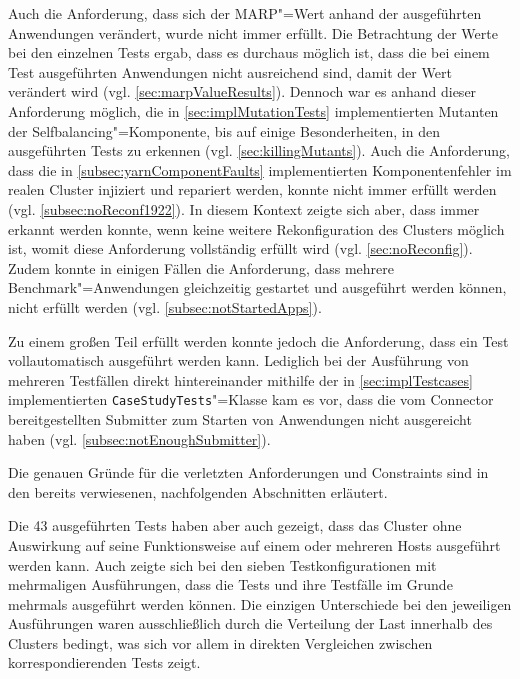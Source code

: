 Auch die Anforderung, dass sich der MARP"=Wert anhand der ausgeführten Anwendungen verändert, wurde nicht immer erfüllt.
Die Betrachtung der Werte bei den einzelnen Tests ergab, dass es durchaus möglich ist, dass die bei einem Test ausgeführten Anwendungen nicht ausreichend sind, damit der Wert verändert wird (vgl. \cref{sec:marpValueResults}).
Dennoch war es anhand dieser Anforderung möglich, die in \cref{sec:implMutationTests} implementierten Mutanten der Selfbalancing"=Komponente, bis auf einige Besonderheiten, in den ausgeführten Tests zu erkennen (vgl. \cref{sec:killingMutants}).
Auch die Anforderung, dass die in \cref{subsec:yarnComponentFaults} implementierten Komponentenfehler im realen Cluster injiziert und repariert werden, konnte nicht immer erfüllt werden (vgl. \cref{subsec:noReconf1922}).
In diesem Kontext zeigte sich aber, dass immer erkannt werden konnte, wenn keine weitere Rekonfiguration des Clusters möglich ist, womit diese Anforderung vollständig erfüllt wird (vgl. \cref{sec:noReconfig}).
Zudem konnte in einigen Fällen die Anforderung, dass mehrere Benchmark"=Anwendungen gleichzeitig gestartet und ausgeführt werden können, nicht erfüllt werden (vgl. \cref{subsec:notStartedApps}).

Zu einem großen Teil erfüllt werden konnte jedoch die Anforderung, dass ein Test vollautomatisch ausgeführt werden kann.
Lediglich bei der Ausführung von mehreren Testfällen direkt hintereinander mithilfe der in \cref{sec:implTestcases} implementierten \texttt{CaseStudyTests}"=Klasse kam es vor, dass die vom Connector bereitgestellten Submitter zum Starten von Anwendungen nicht ausgereicht haben (vgl. \cref{subsec:notEnoughSubmitter}).

Die genauen Gründe für die verletzten Anforderungen und Constraints sind in den bereits verwiesenen, nachfolgenden Abschnitten erläutert.

Die 43 ausgeführten Tests haben aber auch gezeigt, dass das Cluster ohne Auswirkung auf seine Funktionsweise auf einem oder mehreren Hosts ausgeführt werden kann.
Auch zeigte sich bei den sieben Testkonfigurationen mit mehrmaligen Ausführungen, dass die Tests und ihre Testfälle im Grunde mehrmals ausgeführt werden können.
Die einzigen Unterschiede bei den jeweiligen Ausführungen waren ausschließlich durch die Verteilung der Last innerhalb des Clusters bedingt, was sich vor allem in direkten Vergleichen zwischen korrespondierenden Tests zeigt.
